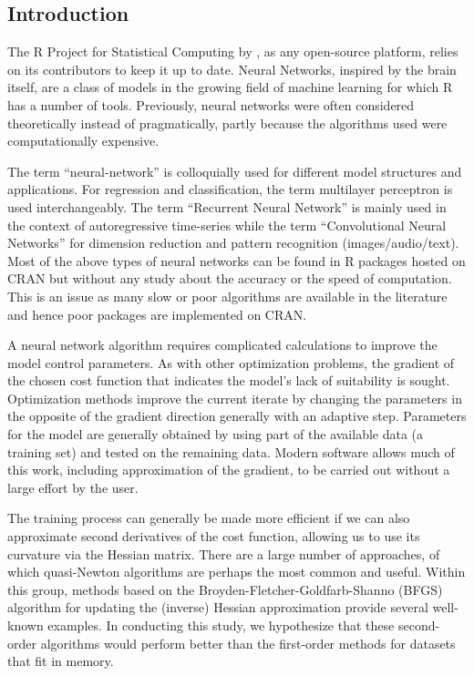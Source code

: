 \hypertarget{introduction}{%
\subsection{Introduction}\label{introduction}}

The \textsf{R} Project for Statistical Computing by \citep{Rsoft20}, as
any open-source platform, relies on its contributors to keep it up to
date. Neural Networks, inspired by the brain itself, are a class of
models in the growing field of machine learning for which \textsf{R} has
a number of tools. Previously, neural networks were often considered
theoretically instead of pragmatically, partly because the algorithms
used were computationally expensive.

The term ``neural-network'' is colloquially used for different model
structures and applications. For regression and classification, the term
multilayer perceptron is used interchangeably. The term ``Recurrent
Neural Network'' is mainly used in the context of autoregressive
time-series while the term ``Convolutional Neural Networks'' for
dimension reduction and pattern recognition (images/audio/text). Most of
the above types of neural networks can be found in R packages hosted on
CRAN but without any study about the accuracy or the speed of
computation. This is an issue as many slow or poor algorithms are
available in the literature and hence poor packages are implemented on
CRAN.

A neural network algorithm requires complicated calculations to improve
the model control parameters. As with other optimization problems, the
gradient of the chosen cost function that indicates the model's lack of
suitability is sought. Optimization methods improve the current iterate
by changing the parameters in the opposite of the gradient direction
generally with an adaptive step. Parameters for the model are generally
obtained by using part of the available data (a training set) and tested
on the remaining data. Modern software allows much of this work,
including approximation of the gradient, to be carried out without a
large effort by the user.

The training process can generally be made more efficient if we can also
approximate second derivatives of the cost function, allowing us to use
its curvature via the Hessian matrix. There are a large number of
approaches, of which quasi-Newton algorithms are perhaps the most common
and useful. Within this group, methods based on the
Broyden-Fletcher-Goldfarb-Shanno (BFGS) algorithm for updating the
(inverse) Hessian approximation provide several well-known examples. In
conducting this study, we hypothesize that these second-order algorithms
would perform better than the first-order methods for datasets that fit
in memory.

